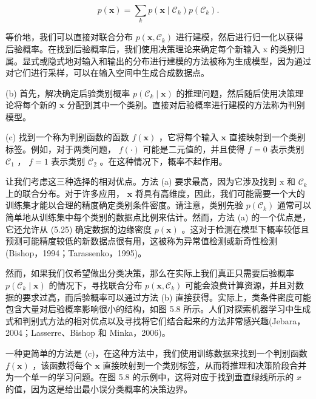 \documentclass[10pt]{article}
\begin{document}
\[
p\left( \mathbf{x}\right)  = \mathop{\sum }\limits_{k}p\left( {\mathbf{x} \mid  {\mathcal{C}}_{k}}\right) p\left( {\mathcal{C}}_{k}\right) . \tag{5.25}
\]

等价地，我们可以直接对联合分布 \(p\left( {\mathbf{x},{\mathcal{C}}_{k}}\right)\) 进行建模，然后进行归一化以获得后验概率。在找到后验概率后，我们使用决策理论来确定每个新输入 \(\mathrm{x}\) 的类别归属。显式或隐式地对输入和输出的分布进行建模的方法被称为生成模型，因为通过对它们进行采样，可以在输入空间中生成合成数据点。

(b) 首先，解决确定后验类别概率 \(p\left( {{\mathcal{C}}_{k} \mid  \mathbf{x}}\right)\) 的推理问题，然后随后使用决策理论将每个新的 \(\mathbf{x}\) 分配到其中一个类别。直接对后验概率进行建模的方法称为判别模型。

(c) 找到一个称为判别函数的函数 \(f\left( \mathbf{x}\right)\) ，它将每个输入 \(\mathbf{x}\) 直接映射到一个类别标签。例如，对于两类问题， \(f\left( \cdot \right)\) 可能是二元值的，并且使得 \(f = 0\) 表示类别 \({\mathcal{C}}_{1}\) ， \(f = 1\) 表示类别 \({\mathcal{C}}_{2}\) 。在这种情况下，概率不起作用。

让我们考虑这三种选择的相对优点。方法 (a) 要求最高，因为它涉及找到 \(\mathrm{x}\) 和 \({\mathcal{C}}_{k}\) 上的联合分布。对于许多应用， \(\mathbf{x}\) 将具有高维度，因此，我们可能需要一个大的训练集才能以合理的精度确定类别条件密度。请注意，类别先验 \(p\left( {\mathcal{C}}_{k}\right)\) 通常可以简单地从训练集中每个类别的数据点比例来估计。然而，方法 (a) 的一个优点是，它还允许从 (5.25) 确定数据的边缘密度 \(p\left( \mathbf{x}\right)\) 。这对于检测在模型下概率较低且预测可能精度较低的新数据点很有用，这被称为异常值检测或新奇性检测(Bishop，1994；Tarassenko，1995)。

然而，如果我们仅希望做出分类决策，那么在实际上我们真正只需要后验概率 \(p\left( {{\mathcal{C}}_{k} \mid  \mathbf{x}}\right)\) 的情况下，寻找联合分布 \(p\left( {\mathbf{x},{\mathcal{C}}_{k}}\right)\) 可能会浪费计算资源，并且对数据的要求过高，而后验概率可以通过方法 (b) 直接获得。实际上，类条件密度可能包含大量对后验概率影响很小的结构，如图 5.8 所示。人们对探索机器学习中生成式和判别式方法的相对优点以及寻找将它们结合起来的方法非常感兴趣(Jebara，2004；Lasserre、Bishop 和 Minka，2006)。

一种更简单的方法是 (c)，在这种方法中，我们使用训练数据来找到一个判别函数 \(f\left( \mathbf{x}\right)\) ，该函数将每个 \(\mathbf{x}\) 直接映射到一个类别标签，从而将推理和决策阶段合并为一个单一的学习问题。在图 5.8 的示例中，这将对应于找到垂直绿线所示的 \(x\) 的值，因为这是给出最小误分类概率的决策边界。
\end{document}
